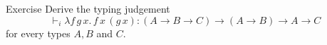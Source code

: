 \begin{frame}{Exercise}
  Derive the typing judgement
    \[
      \vdash_i \lambda f\,g\,x.\, f\,x\, (g\,x) : (A \to B \to C) \to
      (A\to B) \to A \to C
    \]
    for every types $A, B$ and $C$.
\end{frame}

%
%
%
